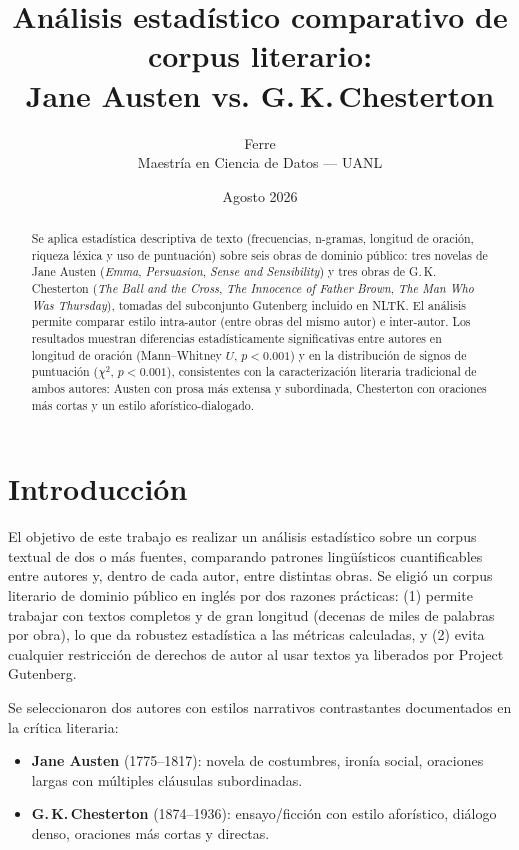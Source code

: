 \documentclass[11pt]{article}
\title{Análisis estadístico comparativo de corpus literario:\\
Jane Austen vs. G.\,K.\,Chesterton}
\author{Ferre \\ Maestría en Ciencia de Datos --- UANL}
\date{Agosto 2026}
\begin{document}
\maketitle

\begin{abstract}
Se aplica estadística descriptiva de texto (frecuencias, n-gramas, longitud de oración, riqueza léxica y uso de puntuación) sobre seis obras de dominio público: tres novelas de Jane Austen (\textit{Emma}, \textit{Persuasion}, \textit{Sense and Sensibility}) y tres obras de G.\,K.\,Chesterton (\textit{The Ball and the Cross}, \textit{The Innocence of Father Brown}, \textit{The Man Who Was Thursday}), tomadas del subconjunto Gutenberg incluido en NLTK. El análisis permite comparar estilo intra-autor (entre obras del mismo autor) e inter-autor. Los resultados muestran diferencias estadísticamente significativas entre autores en longitud de oración (Mann--Whitney $U$, $p < 0.001$) y en la distribución de signos de puntuación ($\chi^2$, $p < 0.001$), consistentes con la caracterización literaria tradicional de ambos autores: Austen con prosa más extensa y subordinada, Chesterton con oraciones más cortas y un estilo aforístico-dialogado.
\end{abstract}

\section{Introducción}

El objetivo de este trabajo es realizar un análisis estadístico sobre un corpus textual de dos o más fuentes, comparando patrones lingüísticos cuantificables entre autores y, dentro de cada autor, entre distintas obras. Se eligió un corpus literario de dominio público en inglés por dos razones prácticas: (1) permite trabajar con textos completos y de gran longitud (decenas de miles de palabras por obra), lo que da robustez estadística a las métricas calculadas, y (2) evita cualquier restricción de derechos de autor al usar textos ya liberados por Project Gutenberg.

Se seleccionaron dos autores con estilos narrativos contrastantes documentados en la crítica literaria:

\begin{itemize}
    \item \textbf{Jane Austen} (1775--1817): novela de costumbres, ironía social, oraciones largas con múltiples cláusulas subordinadas.
    \item \textbf{G.\,K.\,Chesterton} (1874--1936): ensayo/ficción con estilo aforístico, diálogo denso, oraciones más cortas y directas.
\end{itemize}
\end{document}

